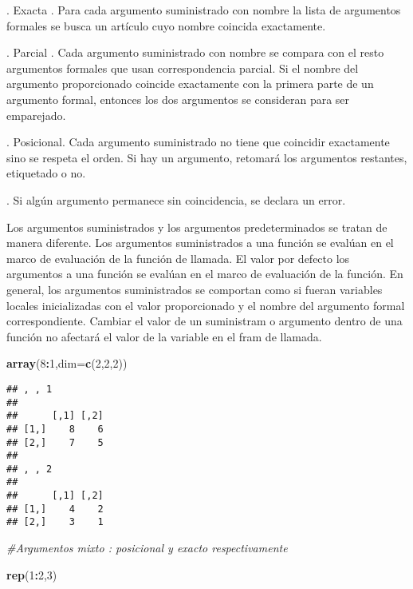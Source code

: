 \documentclass[]{article}
\newenvironment{Shaded}{\begin{snugshade}}{\end{snugshade}}
\newcommand{\KeywordTok}[1]{\textcolor[rgb]{0.13,0.29,0.53}{\textbf{#1}}}
\newcommand{\DataTypeTok}[1]{\textcolor[rgb]{0.13,0.29,0.53}{#1}}
\newcommand{\DecValTok}[1]{\textcolor[rgb]{0.00,0.00,0.81}{#1}}
\newcommand{\CommentTok}[1]{\textcolor[rgb]{0.56,0.35,0.01}{\textit{#1}}}
\newcommand{\OperatorTok}[1]{\textcolor[rgb]{0.81,0.36,0.00}{\textbf{#1}}}
\newcommand{\NormalTok}[1]{#1}
\begin{document}
. Exacta . Para cada argumento suministrado con nombre la lista de
argumentos formales se busca un artículo cuyo nombre coincida
exactamente.

. Parcial . Cada argumento suministrado con nombre se compara con el
resto argumentos formales que usan correspondencia parcial. Si el nombre
del argumento proporcionado coincide exactamente con la primera parte de
un argumento formal, entonces los dos argumentos se consideran para ser
emparejado.

. Posicional. Cada argumento suministrado no tiene que coincidir
exactamente sino se respeta el orden. Si hay un argumento, retomará los
argumentos restantes, etiquetado o no.

. Si algún argumento permanece sin coincidencia, se declara un error.

Los argumentos suministrados y los argumentos predeterminados se tratan
de manera diferente. Los argumentos suministrados a una función se
evalúan en el marco de evaluación de la función de llamada. El valor por
defecto los argumentos a una función se evalúan en el marco de
evaluación de la función. En general, los argumentos suministrados se
comportan como si fueran variables locales inicializadas con el valor
proporcionado y el nombre del argumento formal correspondiente. Cambiar
el valor de un suministram o argumento dentro de una función no afectará
el valor de la variable en el fram de llamada.

\begin{Shaded}
\begin{Highlighting}[]
\KeywordTok{array}\NormalTok{(}\DecValTok{8}\OperatorTok{:}\DecValTok{1}\NormalTok{,}\DataTypeTok{dim=}\KeywordTok{c}\NormalTok{(}\DecValTok{2}\NormalTok{,}\DecValTok{2}\NormalTok{,}\DecValTok{2}\NormalTok{))}
\end{Highlighting}
\end{Shaded}

\begin{verbatim}
## , , 1
## 
##      [,1] [,2]
## [1,]    8    6
## [2,]    7    5
## 
## , , 2
## 
##      [,1] [,2]
## [1,]    4    2
## [2,]    3    1
\end{verbatim}

\begin{Shaded}
\begin{Highlighting}[]
\CommentTok{#Argumentos mixto : posicional y exacto respectivamente}

\KeywordTok{rep}\NormalTok{(}\DecValTok{1}\OperatorTok{:}\DecValTok{2}\NormalTok{,}\DecValTok{3}\NormalTok{)}
\end{Highlighting}
\end{Shaded}
\end{document}
